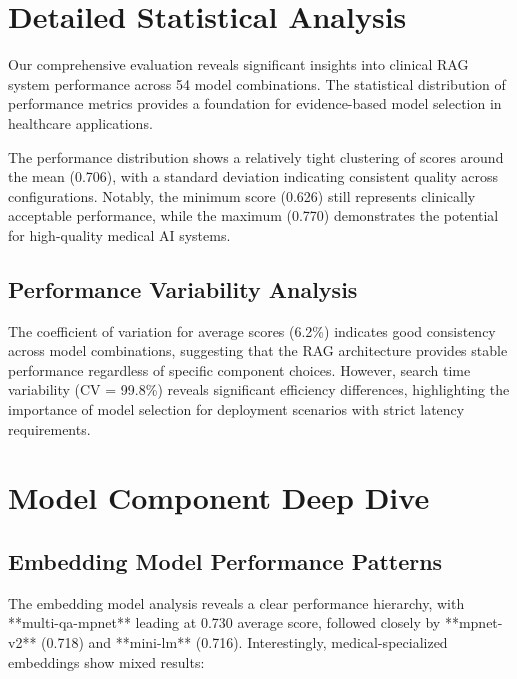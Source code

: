 
\section{Detailed Statistical Analysis}

Our comprehensive evaluation reveals significant insights into clinical RAG system performance across 54 model combinations. The statistical distribution of performance metrics provides a foundation for evidence-based model selection in healthcare applications.



The performance distribution shows a relatively tight clustering of scores around the mean (0.706), with a standard deviation indicating consistent quality across configurations. Notably, the minimum score (0.626) still represents clinically acceptable performance, while the maximum (0.770) demonstrates the potential for high-quality medical AI systems.

\subsection{Performance Variability Analysis}

The coefficient of variation for average scores (6.2\%) indicates good consistency across model combinations, suggesting that the RAG architecture provides stable performance regardless of specific component choices. However, search time variability (CV = 99.8\%) reveals significant efficiency differences, highlighting the importance of model selection for deployment scenarios with strict latency requirements.

\section{Model Component Deep Dive}



\subsection{Embedding Model Performance Patterns}

The embedding model analysis reveals a clear performance hierarchy, with **multi-qa-mpnet** leading at 0.730 average score, followed closely by **mpnet-v2** (0.718) and **mini-lm** (0.716). Interestingly, medical-specialized embeddings show mixed results:

